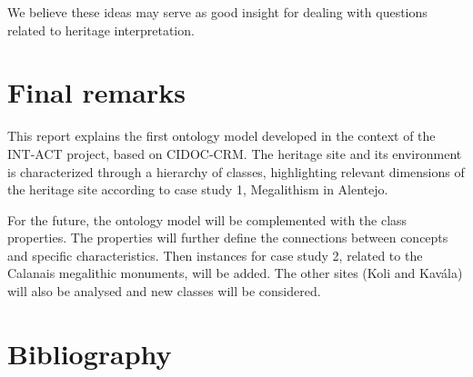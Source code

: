 \documentclass[10pt]{report}
\begin{document}
We believe these ideas may serve as good insight for dealing with questions related to heritage interpretation.






\section{Final remarks}

This report explains the first ontology model developed in the context of the INT-ACT project, based on CIDOC-CRM. The heritage site and its environment is characterized through a hierarchy of classes, highlighting relevant dimensions of the heritage site according to case study 1, Megalithism in Alentejo. 

For the future, the ontology model will be complemented with the class properties. The properties will further define the  connections between concepts and specific characteristics. Then instances for case study 2, related to the Calanais megalithic monuments,  will be added. The other sites (Koli and Kavála) will also be analysed and new classes will be considered.






\clearpage
{}
{}
\renewcommand{\bibname}{Bibliography}
\vspace*{-2.5cm}
\section*{\bibname}
\vspace*{1cm}
\printbibliography[heading=none]





\end{document}
